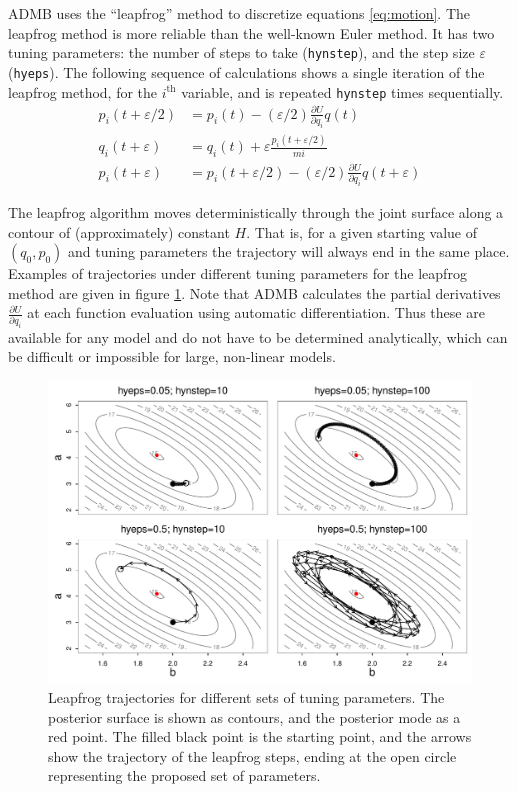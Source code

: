 \documentclass{article}\usepackage[]{graphicx}\usepackage[]{color}
\begin{document}
ADMB uses the ``leapfrog'' method to discretize equations
\eqref{eq:motion}. The leapfrog method is more reliable than
the well-known Euler method. It has two tuning parameters:
the number of steps to take (\texttt{hynstep}), and the step
size $\varepsilon$ (\texttt{hyeps}). The following sequence of
calculations shows a single iteration of the leapfrog
method, for the $i^{\text{th}}$ variable, and is repeated
\texttt{hynstep} times sequentially.
\begin{align*}
  p_i(t+\varepsilon/2)&=p_i(t)-(\varepsilon/2)\frac{\partial{U}}{\partial{q_i}}q(t)\\
  q_i(t+\varepsilon)&=q_i(t)+\varepsilon \frac{p_i(t+\varepsilon/2)}{mi}\\
  p_i(t+\varepsilon)&=p_i(t+\varepsilon/2)-(\varepsilon/2)\frac{\partial{U}}{\partial{q_i}}q(t+\varepsilon)
\end{align*}

The leapfrog algorithm moves deterministically through the
joint surface along a contour of (approximately) constant
$H$. That is, for a given starting value of $(q_0,p_0)$ and
tuning parameters the trajectory will always end in the same
place. Examples of trajectories under different tuning
parameters for the leapfrog method are given in figure
\ref{fig:hybrid_grid_trace}. Note that ADMB calculates the
partial derivatives $\frac{\partial{U}}{\partial{q_i}}$ at
each function evaluation using automatic
differentiation. Thus these are available for any model and
do not have to be determined analytically, which can be
difficult or impossible for large, non-linear models.

\begin{figure}[h]
  \centering
  \includegraphics[width=5in]{../plots/hybrid_grid_trace.pdf}
  \caption{Leapfrog trajectories for different sets of
    tuning parameters. The posterior surface is shown as
    contours, and the posterior mode as a red point. The
    filled black point is the starting point, and the arrows
    show the trajectory of the leapfrog steps, ending at the
    open circle representing the proposed set of
    parameters.}
  \label{fig:hybrid_grid_trace}
\end{figure}
\end{document}
